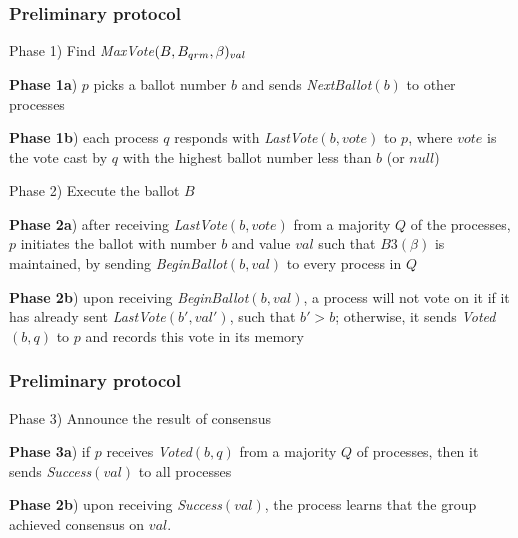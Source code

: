\documentclass[10 pt]{beamer}
\begin{document}
\begin{frame}
\frametitle{Preliminary protocol}%

  Phase 1) Find \textit{MaxVote}$(B, B_{qrm}, \beta)_{val}$
   
  \hspace{3 mm} \textbf{Phase 1a}) $p$ picks a ballot number $b$ and sends \textit{NextBallot}$(b)$ to other processes
   
  \hspace{3 mm} \textbf{Phase 1b}) each process $q$ responds with \textit{LastVote}$(b, vote)$ to $p$, where $vote$ is the vote cast by $q$ with the highest ballot number less than $b$ (or $null$)
   
  \vspace{6 mm}
   
  Phase 2) Execute the ballot $B$
   
  \hspace{3 mm} \textbf{Phase 2a}) after receiving \textit{LastVote}$(b, vote)$ from a majority $Q$ of the processes, $p$ initiates the ballot with number $b$ and value $val$ such that $B3(\beta)$ is maintained, by sending \textit{BeginBallot}$(b, val)$ to every process in $Q$
      
  \hspace{3 mm} \textbf{Phase 2b}) upon receiving \textit{BeginBallot}$(b, val)$, a process will not vote on it if it has already sent \textit{LastVote}$(b', val')$, such that $b' > b$; otherwise, it sends \textit{Voted}$(b, q)$ to $p$ and records this vote in its memory
  
  \vspace{6 mm}

\end{frame}



\begin{frame}
\frametitle{Preliminary protocol}
   
  Phase 3) Announce the result of consensus
   
  \hspace{3 mm} \textbf{Phase 3a}) if $p$ receives \textit{Voted}$(b, q)$ from a majority $Q$ of processes, then it sends \textit{Success}$(val)$ to all processes
      
  \hspace{3 mm} \textbf{Phase 2b}) upon receiving \textit{Success}$(val)$, the process learns that the group achieved consensus on $val$.
 
\end{frame}
 
\end{document}

